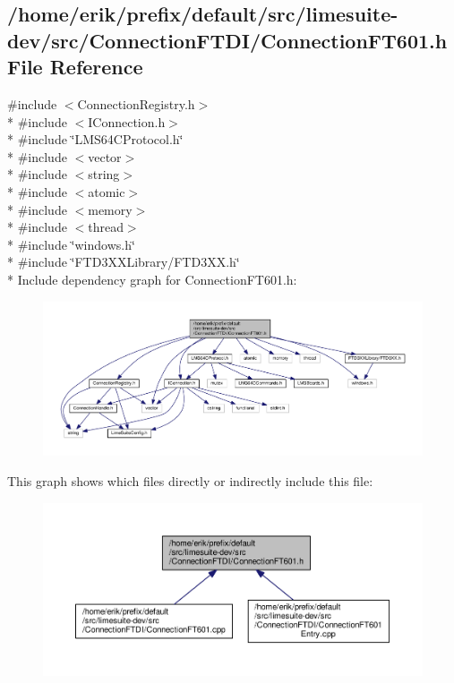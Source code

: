 \subsection{/home/erik/prefix/default/src/limesuite-\/dev/src/\+Connection\+F\+T\+D\+I/\+Connection\+F\+T601.h File Reference}
\label{ConnectionFT601_8h}
{\ttfamily \#include $<$Connection\+Registry.\+h$>$}\\*
{\ttfamily \#include $<$I\+Connection.\+h$>$}\\*
{\ttfamily \#include \char`\"{}L\+M\+S64\+C\+Protocol.\+h\char`\"{}}\\*
{\ttfamily \#include $<$vector$>$}\\*
{\ttfamily \#include $<$string$>$}\\*
{\ttfamily \#include $<$atomic$>$}\\*
{\ttfamily \#include $<$memory$>$}\\*
{\ttfamily \#include $<$thread$>$}\\*
{\ttfamily \#include \char`\"{}windows.\+h\char`\"{}}\\*
{\ttfamily \#include \char`\"{}F\+T\+D3\+X\+X\+Library/\+F\+T\+D3\+X\+X.\+h\char`\"{}}\\*
Include dependency graph for Connection\+F\+T601.\+h\+:
\nopagebreak
\begin{figure}[H]
\begin{center}
\leavevmode
\includegraphics[width=350pt]{d8/d7d/ConnectionFT601_8h__incl}
\end{center}
\end{figure}
This graph shows which files directly or indirectly include this file\+:
\nopagebreak
\begin{figure}[H]
\begin{center}
\leavevmode
\includegraphics[width=350pt]{d7/db5/ConnectionFT601_8h__dep__incl}
\end{center}
\end{figure}
